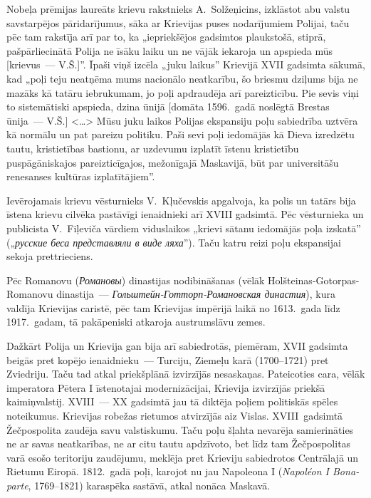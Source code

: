 \documentclass[twoside,a5paper,12pt,fleqn,openany]{extbook}
\newcommand{\rutxti}[1]{\textit{\textrussian{#1}}}
\newcommand{\frtxti}[1]{\textit{\textfrench{#1}}}
\newcommand{\citespace}{<\dots{}>}
\begin{document}
Nobeļa prēmijas laureāts krievu rakstnieks A.~Solžeņicins, izklāstot abu valstu savstarpējos pāridarījumus, sāka ar Krievijas puses nodarījumiem Polijai, taču pēc tam rakstīja arī par to, ka „iepriekšējos gadsimtos plaukstošā, stiprā, pašpārliecinātā Polija ne īsāku laiku un ne vājāk iekaroja un apspieda mūs [krievus~--- V.Š.]”. Īpaši viņš izcēla „juku laikus” Krievijā XVII gadsimta sākumā, kad „poļi teju neatņēma mums nacionālo neatkarību, šo briesmu dziļums bija ne mazāks kā tatāru iebrukumam, jo poļi apdraudēja arī pareizticību. Pie sevis viņi to sistemātiski apspieda, dzina ūnijā [domāta 1596.~gadā noslēgtā Brestas ūnija~--- V.Š.] \citespace{} Mūsu juku laikos Polijas ekspansiju poļu sabiedrība uztvēra kā normālu un pat pareizu politiku. Paši sevi poļi iedomājās kā Dieva izredzētu tautu, kristietības bastionu, ar uzdevumu izplatīt īstenu kristietību puspāgāniskajos pareizticīgajos, mežonīgajā Maskavijā, būt par universitāšu renesanses kultūras izplatītājiem”.

Ievērojamais krievu vēsturnieks V.~Kļučevskis apgalvoja, ka polis un tatārs bija īstena krievu cilvēka pastāvīgi ienaidnieki arī XVIII gadsimtā. Pēc vēsturnieka un publicista V.~Fiļeviča vārdiem viduslaikos „krievi sātanu iedomājās poļa izskatā” („\rutxti{русские беса представляли в виде ляха}”). Taču katru reizi poļu ekspansijai sekoja prettrieciens.

Pēc Romanovu (\rutxti{Романовы}) dinastijas nodibināšanas (vēlāk Holšteinas-Gotorpas-Romanovu dinastija~--- \rutxti{Гольштейн-Готторп-Романовская династия}), kura valdīja Krievijas caristē, pēc tam Krievijas impērijā laikā no 1613.~gada līdz 1917.~gadam, tā pakāpeniski atkaroja austrumslāvu zemes.

Dažkārt Polija un Krievija gan bija arī sabiedrotās, piemēram, XVII gadsimta beigās pret kopējo ienaidnieku~--- Turciju, Ziemeļu karā (1700--1721) pret Zviedriju. Taču tad atkal priekšplānā izvirzījās nesaskaņas. Pateicoties cara, vēlāk imperatora Pētera I īstenotajai modernizācijai, Krievija izvirzījās priekšā kaimiņvalstij. XVIII~--- XX gadsimtā jau tā diktēja poļiem politiskās spēles noteikumus. Krievijas robežas rietumos atvirzījās aiz Vislas. XVIII~gadsimtā Žečpospolita zaudēja savu valstiskumu. Taču poļu šļahta nevarēja samierināties ne ar savas neatkarības, ne ar citu tautu apdzīvoto, bet līdz tam Žečpospolitas varā esošo teritoriju zaudējumu, meklēja pret Krieviju sabiedrotos Centrālajā un Rietumu Eiropā. 1812.~gadā poļi, karojot nu jau Napoleona I (\frtxti{Napoléon I Bonaparte}, 1769--1821) karaspēka sastāvā, atkal nonāca Maskavā.
\end{document}
